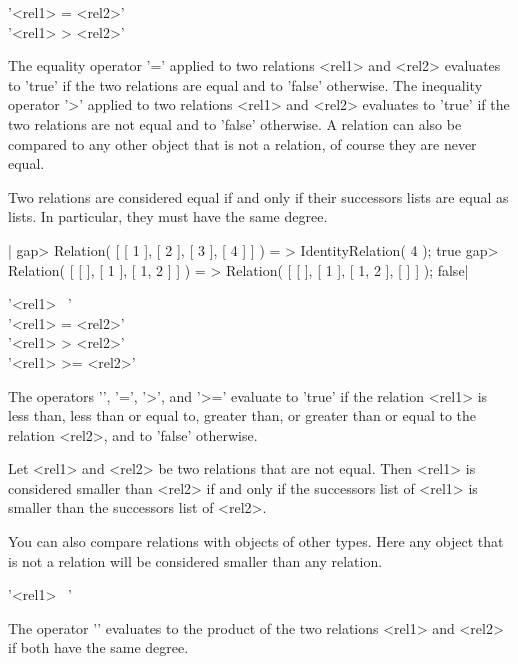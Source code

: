 %
%

'<rel1> = <rel2>'\\
'<rel1> \<> <rel2>'

The equality operator  '='  applied to  two relations <rel1>  and  <rel2>
evaluates to   'true' if the   two  relations are  equal  and  to 'false'
otherwise.  The inequality operator '\<>' applied to two relations <rel1>
and <rel2> evaluates to 'true' if the two  relations are not equal and to
'false'  otherwise.  A relation can also  be compared to any other object
that is not a relation, of course they are never equal.
    
Two relations are considered equal if and only if their  successors lists
are equal as lists.  In particular, they must have the same degree.

|    gap> Relation( [ [ 1 ], [ 2 ], [ 3 ], [ 4 ] ] ) =
    > IdentityRelation( 4 );
    true
    gap> Relation( [ [ ], [ 1 ], [ 1, 2 ] ] ) =
    > Relation( [ [ ], [ 1 ], [ 1, 2 ], [ ] ] );
    false|

\vspace{5mm}
'<rel1> \<\ <rel2>' \\
'<rel1> \<= <rel2>' \\
'<rel1>  >  <rel2>' \\
'<rel1>  >= <rel2>'

The  operators '\<',  '\<=', '>',  and  '>='  evaluate  to 'true' if  the
relation <rel1>  is less than, less  than or equal   to, greater than, or
greater than or equal to the relation <rel2>, and to 'false' otherwise.

Let <rel1> and <rel2> be two  relations that are  not equal.  Then <rel1>
is considered smaller  than <rel2> if and only  if the successors list of 
<rel1> is  smaller than the successors list of  <rel2>.

You can  also compare relations  with objects  of other  types.  Here any
object  that is   not a relation   will  be considered smaller than   any
relation.

 
'<rel1> \*\ <rel2>'%

The operator '\*'  evaluates to the product of  the  two relations <rel1>
and <rel2> if both have the same degree.

